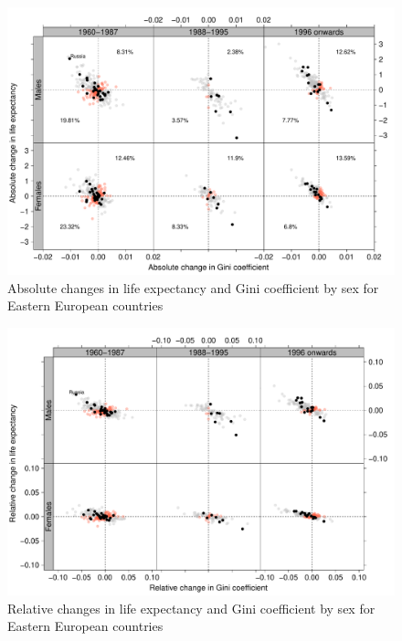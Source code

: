 \documentclass{article}
\begin{document}
\begin{figure}[h!]
\caption{Absolute changes in life expectancy and Gini coefficient by sex for Eastern European countries}
\centering
\begin{center}
\includegraphics[scale=.4]{Figures/F2_SS}
\end{center}
\end{figure}

\newpage

\begin{figure}[h!]
\caption{Relative changes in life expectancy and Gini coefficient by sex for Eastern European countries}
\centering
\begin{center}
\includegraphics[scale=.4]{Figures/F3_SS}
\end{center}
\end{figure}
\end{document}
